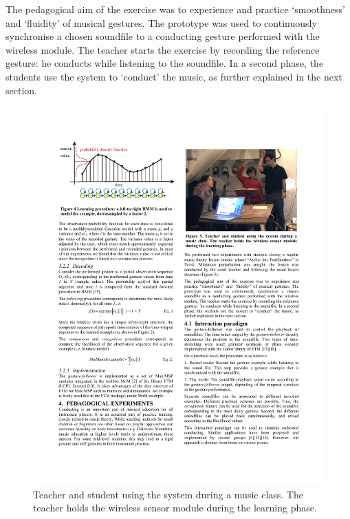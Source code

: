 The pedagogical aim of the exercise was to experience and practice `smoothness' and `fluidity' of musical gestures. The prototype was used to continuously synchronise a chosen soundfile to a conducting gesture performed with the wireless module. The teacher starts the exercise by recording the reference gesture:  he conducts while listening to the soundfile. In a second phase, the students use the system to `conduct' the music, as further explained in the next section. 

\begin{figure}[t]
\center
\includegraphics[scale=1.]{fig5.pdf}
%
%
\caption{Teacher and student using the system during a music class. The teacher holds the wireless sensor module during the learning phase. }
\label{Bevilacqua:fig5}       %
\end{figure}


